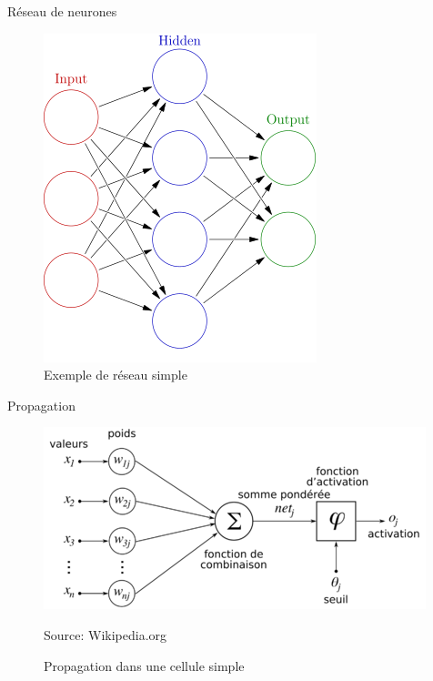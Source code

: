 \documentclass{beamer}
\begin{document}
\begin{frame}{Réseau de neurones}
  \begin{figure}
  \begin{center}
  \includegraphics[scale=0.4]{images/reseau_simple.png}
  \caption{Exemple de réseau simple}
  \end{center}
  \end{figure}
\end{frame}

\begin{frame}{Propagation}
  \begin{figure}
  \begin{center}
  \includegraphics[scale=0.70]{images/propagation_simple.png}
  \caption{Propagation dans une cellule simple}
  {\tiny Source: Wikipedia.org}
  \end{center}
  \end{figure}
\end{frame}
\end{document}
